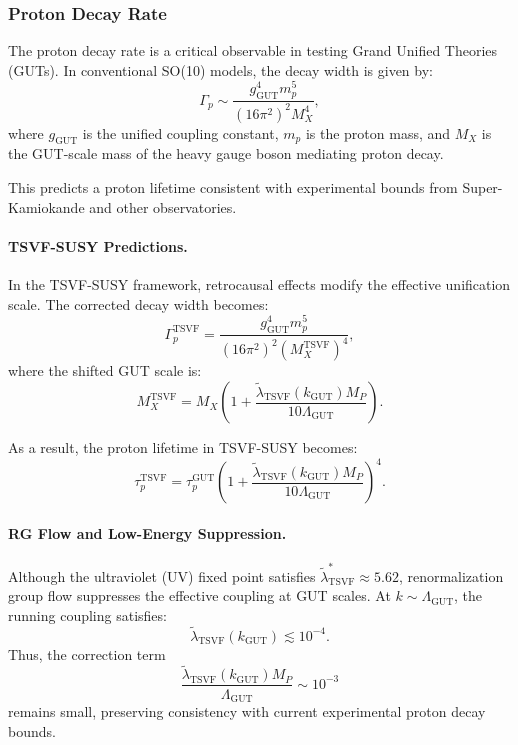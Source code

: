 \documentclass[twocolumn,superscriptaddress,floatfix]{revtex4-2}
\begin{document}
\subsubsection{Proton Decay Rate}
\label{subsec:proton_decay_rate}

The proton decay rate is a critical observable in testing Grand Unified Theories (GUTs). In conventional SO(10) models, the decay width is given by:
\begin{equation}
\Gamma_p \sim \frac{g_{\text{GUT}}^4 m_p^5}{(16\pi^2)^2 M_X^4},
\label{eq:gamma_p}
\end{equation}
where $g_{\text{GUT}}$ is the unified coupling constant, $m_p$ is the proton mass, and $M_X$ is the GUT-scale mass of the heavy gauge boson mediating proton decay.

This predicts a proton lifetime consistent with experimental bounds from Super-Kamiokande and other observatories.

\paragraph{TSVF-SUSY Predictions.}
In the TSVF-SUSY framework, retrocausal effects modify the effective unification scale. The corrected decay width becomes:
\begin{equation}
\Gamma_p^{\text{TSVF}} = \frac{g_{\text{GUT}}^4 m_p^5}{(16\pi^2)^2 (M_X^{\text{TSVF}})^4},
\end{equation}
where the shifted GUT scale is:
\begin{equation}
M_X^{\text{TSVF}} = M_X\left(1 + \frac{\tilde{\lambda}_{\text{TSVF}}(k_{\text{GUT}}) M_P}{10\Lambda_{\text{GUT}}}\right).
\label{eq:Mx_shift_decay}
\end{equation}

As a result, the proton lifetime in TSVF-SUSY becomes:
\begin{equation}
\tau_p^{\text{TSVF}} = \tau_p^{\text{GUT}}\left(1 + \frac{\tilde{\lambda}_{\text{TSVF}}(k_{\text{GUT}}) M_P}{10\Lambda_{\text{GUT}}}\right)^4.
\label{eq:tau_TSVF}
\end{equation}

\paragraph{RG Flow and Low-Energy Suppression.}
Although the ultraviolet (UV) fixed point satisfies $\tilde{\lambda}_{\text{TSVF}}^* \approx 5.62$, renormalization group flow suppresses the effective coupling at GUT scales. At $k \sim \Lambda_{\text{GUT}}$, the running coupling satisfies:
\begin{equation}
\tilde{\lambda}_{\text{TSVF}}(k_{\text{GUT}}) \lesssim 10^{-4}.
\end{equation}
Thus, the correction term
\[
\frac{\tilde{\lambda}_{\text{TSVF}}(k_{\text{GUT}}) M_P}{\Lambda_{\text{GUT}}} \sim 10^{-3}
\]
remains small, preserving consistency with current experimental proton decay bounds.
\end{document}
